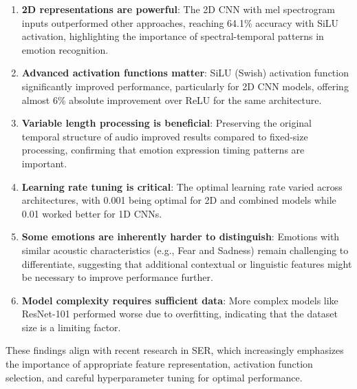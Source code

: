 \begin{enumerate}
    \item \textbf{2D representations are powerful}: The 2D CNN with mel spectrogram inputs outperformed other approaches, reaching 64.1\% accuracy with SiLU activation, highlighting the importance of spectral-temporal patterns in emotion recognition.
    
    \item \textbf{Advanced activation functions matter}: SiLU (Swish) activation function significantly improved performance, particularly for 2D CNN models, offering almost 6\% absolute improvement over ReLU for the same architecture.
    
    \item \textbf{Variable length processing is beneficial}: Preserving the original temporal structure of audio improved results compared to fixed-size processing, confirming that emotion expression timing patterns are important.
    
    \item \textbf{Learning rate tuning is critical}: The optimal learning rate varied across architectures, with 0.001 being optimal for 2D and combined models while 0.01 worked better for 1D CNNs.
    
    \item \textbf{Some emotions are inherently harder to distinguish}: Emotions with similar acoustic characteristics (e.g., Fear and Sadness) remain challenging to differentiate, suggesting that additional contextual or linguistic features might be necessary to improve performance further.

    \item \textbf{Model complexity requires sufficient data}: More complex models like ResNet-101 performed worse due to overfitting, indicating that the dataset size is a limiting factor.
\end{enumerate}

These findings align with recent research in SER, which increasingly emphasizes the importance of appropriate feature representation, activation function selection, and careful hyperparameter tuning for optimal performance.